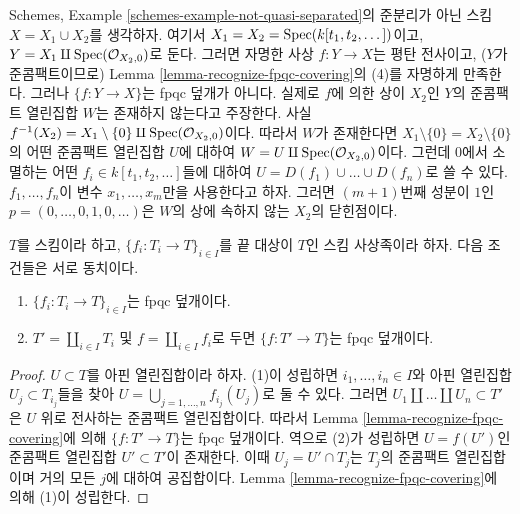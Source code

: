 \begin{example}
\label{example-not-fpqc}
Schemes, Example \ref{schemes-example-not-quasi-separated}의 준분리가 아닌
스킴 $X = X_1 \cup X_2$를 생각하자. 여기서
$X_1 = X_2 = \mathop{\mathrm{Spec}}(k[t_1,t_2,\dots])$이고,
$Y = X_1 \amalg \mathop{\mathrm{Spec}}(\mathcal{O}_{X_2, 0})$로 둔다. 그러면 자명한 사상
$f : Y \to X$는 평탄 전사이고, ($Y$가 준콤팩트이므로) Lemma
\ref{lemma-recognize-fpqc-covering}의 (4)를 자명하게 만족한다. 그러나
$\{f : Y \to X\}$는 fpqc 덮개가 아니다. 실제로 $f$에 의한 상이 $X_2$인
$Y$의 준콤팩트 열린집합 $W$는 존재하지 않는다고 주장한다. 사실
$f^{-1}(X_2) = X_1 \setminus \{0\} \amalg \mathop{\mathrm{Spec}}(\mathcal{O}_{X_2, 0})$이다.
따라서 $W$가 존재한다면
$X_1 \setminus \{0\} = X_2 \setminus \{0\}$의 어떤 준콤팩트 열린집합
$U$에 대하여 $W = U \amalg \mathop{\mathrm{Spec}}(\mathcal{O}_{X_2, 0})$이다. 그런데
$0$에서 소멸하는
어떤 $f_i \in k[t_1, t_2, \ldots]$들에 대하여
$U = D(f_1) \cup \ldots \cup D(f_n)$로 쓸 수 있다.
$f_1, \ldots, f_n$이 변수 $x_1, \ldots, x_m$만을 사용한다고 하자.
그러면 $(m + 1)$번째 성분이 $1$인
$p = (0, \ldots, 0, 1, 0, \ldots)$은 $W$의 상에 속하지 않는 $X_2$의
닫힌점이다.
\end{example}

\begin{lemma}
\label{lemma-disjoint-union-is-fpqc-covering}
$T$를 스킴이라 하고, $\{f_i : T_i \to T\}_{i \in I}$를 끝 대상이
$T$인 스킴 사상족이라 하자. 다음 조건들은 서로 동치이다.
\begin{enumerate}
\item $\{f_i : T_i \to T\}_{i \in I}$는 fpqc 덮개이다.
\item $T' = \coprod_{i \in I} T_i$ 및 $f = \coprod_{i \in I} f_i$로 두면
$\{f : T' \to T\}$는 fpqc 덮개이다.
\end{enumerate}
\end{lemma}

\begin{proof}
$U \subset T$를 아핀 열린집합이라 하자. (1)이 성립하면
$i_1, \ldots, i_n \in I$와 아핀 열린집합 $U_j \subset T_{i_j}$들을 찾아
$U = \bigcup_{j = 1, \ldots, n} f_{i_j}(U_j)$로 둘 수 있다. 그러면
$U_1 \amalg \ldots \amalg U_n \subset T'$은 $U$ 위로 전사하는 준콤팩트
열린집합이다. 따라서 Lemma \ref{lemma-recognize-fpqc-covering}에 의해
$\{f : T' \to T\}$는 fpqc 덮개이다. 역으로 (2)가 성립하면
$U = f(U')$인 준콤팩트 열린집합 $U' \subset T'$이 존재한다. 이때
$U_j = U' \cap T_j$는 $T_j$의 준콤팩트 열린집합이며 거의 모든 $j$에
대하여 공집합이다. Lemma \ref{lemma-recognize-fpqc-covering}에 의해
(1)이 성립한다.
\end{proof}

